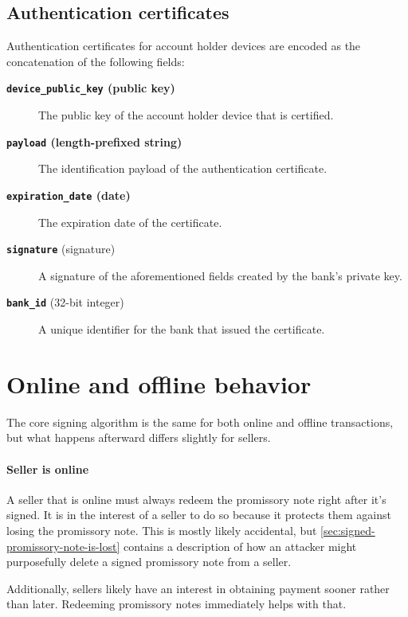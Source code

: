 \documentclass[12pt,a4paper]{article}
\begin{document}
\begin{multicols}{2}
	\subsection{Authentication certificates}

  	Authentication certificates for account holder devices are encoded as the concatenation of the following fields:

	\begin{description}
		\item[\textbf{\texttt{device\_public\_key} (public key)}] The public key of the account holder device that is certified.
		
		\item[\textbf{\texttt{payload} (length-prefixed string)}] The identification payload of the authentication certificate.
		
		\item[\textbf{\texttt{expiration\_date} (date)}] The expiration date of the certificate.
		
		\item[\textbf{\texttt{signature}} (signature)] A signature of the aforementioned fields created by the bank's private key.
		
		\item[\textbf{\texttt{bank\_id}} (32-bit integer)] A unique identifier for the bank that issued the certificate.
	\end{description}

	\section{Online and offline behavior}

	The core signing algorithm is the same for both online and offline transactions, but what happens afterward differs slightly for sellers.

	\paragraph{Seller is online}
	
	A seller that is online must always redeem the promissory note right after it's signed. It is in the interest of a seller to do so because it protects them against losing the promissory note. This is mostly likely accidental, but \autoref{sec:signed-promissory-note-is-lost} contains a description of how an attacker might purposefully delete a signed promissory note from a seller.

	Additionally, sellers likely have an interest in obtaining payment sooner rather than later. Redeeming promissory notes immediately helps with that.


\end{multicols}
\end{document}
